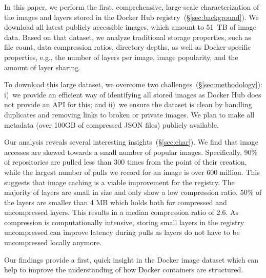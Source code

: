 In this paper, we perform the first, comprehensive, large-scale characterization
of the images and layers stored in the Docker Hub
registry~(\S\ref{sec:background}).
%
We download all latest publicly accessible images, which amount to 51~TB of
image data. Based on that dataset, we analyze traditional storage properties, such
as file count, data compression ratios, directory depths, as well as
Docker-specific properties, e.g., the number of layers per image, image popularity,
and the amount of layer sharing.


To download this large dataset, we overcome two
challenges~(\S\ref{sec:methodology}): i)~we provide an efficient way of identifying
all stored images as Docker Hub does not provide an API for this;
and ii)~we ensure the dataset is clean by handling
duplicates and removing links to broken or private images.
We plan to make all metadata (over 100GB of compressed
JSON files) publicly available.

Our analysis reveals several interesting insights~(\S\ref{sec:char}). 
We find that image
accesses are skewed towards a small number of popular images. Specifically,
90\% of repositories are pulled less than 300 times from the point of their
creation, while the largest number of pulls we record for an image is
over 600 million. This suggests that image caching is a viable improvement
for the registry.
%
The majority of layers are small in size and only show a low compression ratio.
50\% of the layers are smaller than 4 MB which holds both for compressed and 
uncompressed layers. This results in a median compression ratio of 2.6.
As compression is computationally intensive, storing small layers in the
registry uncompressed can improve latency during pulls as layers do not
have to be uncompressed locally anymore.

Our findings provide a first, quick insight in the Docker image dataset which
can help to improve the understanding of how Docker containers are structured.


